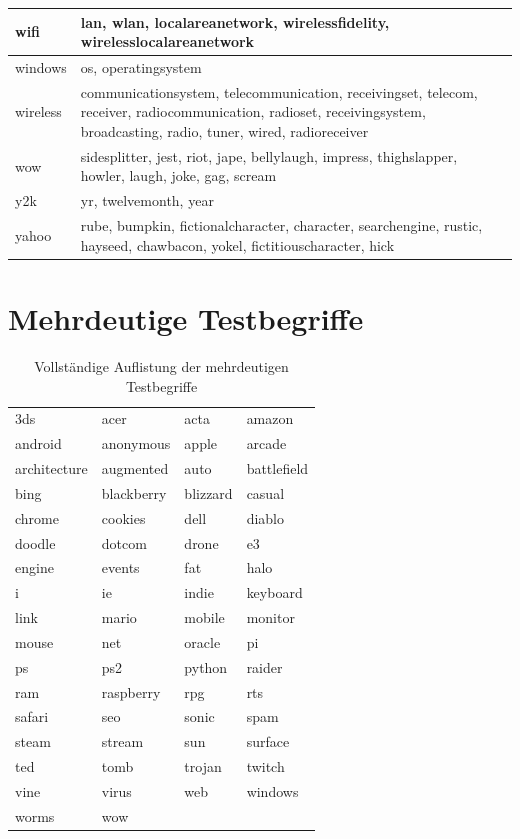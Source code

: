 \documentclass[12pt,a4paper]{report}
\begin{document}
\begin{table}[H]
\begin{center}
\begin{tabular}{ |l|p{14cm}|}
\hline
wifi & lan, wlan, localareanetwork, wirelessfidelity, wirelesslocalareanetwork\\
\hline
windows & os, operatingsystem\\
\hline
wireless & communicationsystem, telecommunication, receivingset, telecom, receiver, radiocommunication, radioset, receivingsystem, broadcasting, radio, tuner, wired, radioreceiver\\
\hline
wow & sidesplitter, jest, riot, jape, bellylaugh, impress, thighslapper, howler, laugh, joke, gag, scream\\
\hline
y2k & yr, twelvemonth, year\\
\hline
yahoo & rube, bumpkin, fictionalcharacter, character, searchengine, rustic, hayseed, chawbacon, yokel, fictitiouscharacter, hick\\
\hline


\end{tabular}
\end{center}
\end{table}

\fi

\section{Mehrdeutige Testbegriffe}
\label{sec:mehrdeutigetestbegriffe}
\begin{table}[H]
\caption{Vollständige Auflistung der mehrdeutigen Testbegriffe}
\begin{center}
\begin{tabular}{l|l|l|l}\\
3ds & acer & acta & amazon\\
android & anonymous & apple & arcade\\
architecture & augmented & auto & battlefield\\
bing & blackberry & blizzard & casual\\
chrome & cookies & dell & diablo\\
doodle & dotcom & drone & e3\\
engine & events & fat & halo\\
i & ie & indie & keyboard\\
link & mario & mobile & monitor\\
mouse & net & oracle & pi\\
ps & ps2 & python & raider\\
ram & raspberry & rpg & rts\\
safari & seo & sonic & spam\\
steam & stream & sun & surface\\
ted & tomb & trojan & twitch\\
vine & virus & web & windows\\
worms & wow &  & \\

\end{tabular}
\end{center}
\end{table}
	
\end{document}
